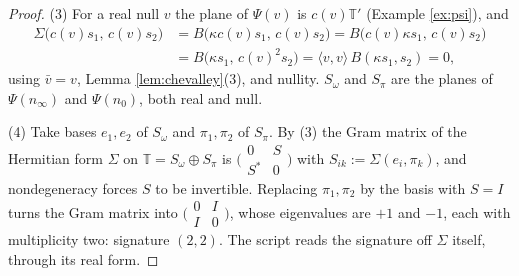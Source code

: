 \documentclass[11pt]{article}
\theoremstyle{definition}
\newcommand{\T}{\mathbb{T}}
\newcommand{\nO}{n_0}
\newcommand{\nInf}{n_\infty}
\newcommand{\ip}[2]{\langle #1, #2\rangle}
\newcommand{\Som}{S_\omega}
\newcommand{\Spi}{S_\pi}
\begin{document}
\begin{proof}
(3) For a real null $v$ the plane of $\Psi(v)$ is $c(v)\T'$ (Example \ref{ex:psi}), and
\begin{align*}
\Sigma\bigl(c(v)s_1,\, c(v)s_2\bigr) &= B\bigl(\kappa c(v)s_1,\, c(v)s_2\bigr) = B\bigl(c(v)\kappa s_1,\, c(v)s_2\bigr)\\
&= B\bigl(\kappa s_1,\, c(v)^2 s_2\bigr) = \ip{v}{v}\,B(\kappa s_1, s_2) = 0 ,
\end{align*}
using $\bar v = v$, Lemma \ref{lem:chevalley}(3), and nullity. $\Som$ and $\Spi$ are the planes of $\Psi(\nInf)$ and $\Psi(\nO)$, both real and null.

(4) Take bases $e_1, e_2$ of $\Som$ and $\pi_1, \pi_2$ of $\Spi$. By (3) the Gram matrix of the Hermitian form $\Sigma$ on $\T = \Som\oplus\Spi$ is $\bigl(\begin{smallmatrix} 0 & S \\ S^* & 0\end{smallmatrix}\bigr)$ with $S_{ik} := \Sigma(e_i, \pi_k)$, and nondegeneracy forces $S$ to be invertible. Replacing $\pi_1, \pi_2$ by the basis with $S = I$ turns the Gram matrix into $\bigl(\begin{smallmatrix} 0 & I \\ I & 0\end{smallmatrix}\bigr)$, whose eigenvalues are $+1$ and $-1$, each with multiplicity two: signature $(2,2)$. The script reads the signature off $\Sigma$ itself, through its real form.


\end{proof}
\end{document}
